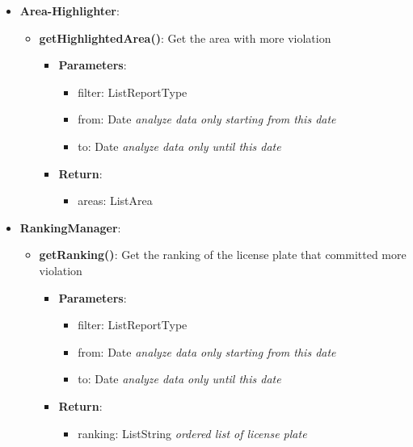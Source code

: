 \documentclass{article}
\begin{document}
\begin{itemize}
\begin{itemize}
\begin{itemize}
				\end{itemize}
		\end{itemize}
	\item \textbf{Area-Highlighter}: 
		\begin{itemize}
			\item \textbf{getHighlightedArea()}:
				Get the area with more violation
				\begin{itemize}
					\item \textbf{Parameters}:
						\begin{itemize}
							\item filter: List\textlangle{}ReportType\textrangle{}
							\item from: Date \textit{analyze data only starting from this date}
							\item to: Date \textit{analyze data only until this date}
						\end{itemize}
					\item \textbf{Return}:
						\begin{itemize}
							\item areas: List\textlangle{}Area\textrangle{}
						\end{itemize}
				\end{itemize} 
		\end{itemize}
	\item \textbf{RankingManager}: 
		\begin{itemize}
			\item \textbf{getRanking()}:
			Get the ranking of the license plate that committed more violation
				\begin{itemize}
					\item \textbf{Parameters}:
						\begin{itemize}
							\item filter: List\textlangle{}ReportType\textrangle{}
							\item from: Date \textit{analyze data only starting from this date}
							\item to: Date \textit{analyze data only until this date}
						\end{itemize}
					\item \textbf{Return}:
						\begin{itemize}
							\item ranking: List\textlangle{}String\textrangle{} \textit{ordered list of license plate}
						\end{itemize}
				\end{itemize}	
		\end{itemize}

\end{itemize}
\end{document}
